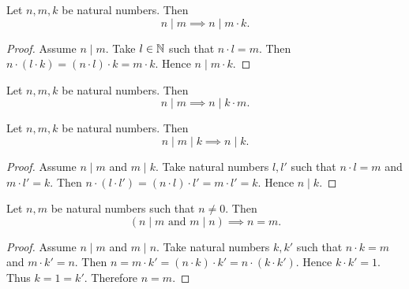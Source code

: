 \documentclass[../arithmetic.tex]{subfiles}
\begin{document}
  \begin{forthel}
    \begin{proposition}
      Let $n, m, k$ be natural numbers.
      Then \[ n \mid m \implies n \mid m \cdot k. \]
    \end{proposition}
    \begin{proof}
      Assume $n \mid m$.
      Take $l \in \mathbb{N}$ such that $n \cdot l = m$.
      Then $n \cdot (l \cdot k)
        = (n \cdot l) \cdot k
        = m \cdot k$.
      Hence $n \mid m \cdot k$.
    \end{proof}
  \end{forthel}

  \begin{forthel}
    \begin{corollary}
      Let $n, m, k$ be natural numbers.
      Then \[ n \mid m \implies n \mid k \cdot m. \]
    \end{corollary}
  \end{forthel}

  \begin{forthel}
    \begin{proposition}
      Let $n, m, k$ be natural numbers.
      Then \[ n \mid m \mid k \implies n \mid k. \]
    \end{proposition}
    \begin{proof}
      Assume $n \mid m$ and $m \mid k$.
      Take natural numbers $l,l'$ such that $n \cdot l = m$ and $m \cdot l' = k$.
      Then $n \cdot (l \cdot l')
        = (n \cdot l) \cdot l'
        = m \cdot l'
        = k$.
      Hence $n \mid k$.
    \end{proof}
  \end{forthel}

  \begin{forthel}
    \begin{proposition}
      Let $n, m$ be natural numbers such that $n \neq 0$.
      Then \[ (\text{$n \mid m$ and $m \mid n$}) \implies n = m. \]
    \end{proposition}
    \begin{proof}
      Assume $n \mid m$ and $m \mid n$.
      Take natural numbers $k,k'$ such that $n \cdot k = m$ and $m \cdot k' = n$.
      Then $n
        = m \cdot k'
        = (n \cdot k) \cdot k'
        = n \cdot (k \cdot k')$.
      Hence $k \cdot k' = 1$.
      Thus $k = 1 = k'$.
      Therefore $n = m$.
    \end{proof}
  \end{forthel}
\end{document}
